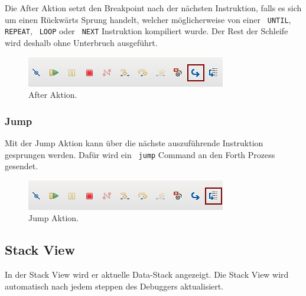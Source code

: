 Die After Aktion setzt den Breakpoint nach der nächsten Instruktion, falls es sich um einen Rückwärts Sprung handelt, welcher möglicherweise von einer 
\verb! UNTIL!, \verb! REPEAT!, \verb! LOOP! oder \verb! NEXT! Instruktion kompiliert wurde. Der Rest der Schleife wird deshalb ohne Unterbruch ausgeführt.

\begin{figure}[H]
	\centering
		\includegraphics[scale=1]{debugger/after.png}
		\caption{After Aktion.}
		\label{fig:after}
\end{figure}

\subsubsection{Jump}

Mit der Jump Aktion kann über die nächste auszuführende Instruktion gesprungen werden. Dafür wird ein \verb! jump! Command an den Forth Prozess gesendet.

\begin{figure}[H]
	\centering
		\includegraphics[scale=1]{debugger/jump.png}
		\caption{Jump Aktion.}
		\label{fig:jump}
\end{figure}

\newpage

\subsection{Stack View}

In der Stack View wird er aktuelle Data-Stack angezeigt. Die Stack View wird automatisch nach jedem steppen des Debuggers aktualisiert.

